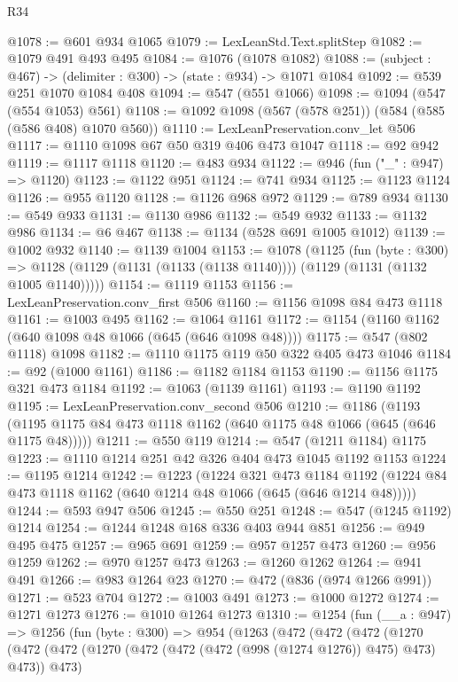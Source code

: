 \begin{lexlean}{R34}
\begin{coremodule}
@1078 := @601 @934 @1065
@1079 := LexLeanStd.Text.splitStep
@1082 := @1079 @491 @493 @495
@1084 := @1076 (@1078 @1082)
@1088 := (subject : @467) -> (delimiter : @300) -> (state : @934) -> @1071 @1084
@1092 := @539 @251 @1070 @1084 @408
@1094 := @547 (@551 @1066)
@1098 := @1094 (@547 (@554 @1053) @561)
@1108 := @1092 @1098 (@567 (@578 @251)) (@584 (@585 (@586 @408) @1070 @560))
@1110 := LexLeanPreservation.conv_let @506
@1117 := @1110 @1098 @67 @50 @319 @406 @473 @1047
@1118 := @92 @942
@1119 := @1117 @1118
@1120 := @483 @934
@1122 := @946 (fun ("_" : @947) => @1120)
@1123 := @1122 @951
@1124 := @741 @934
@1125 := @1123 @1124
@1126 := @955 @1120
@1128 := @1126 @968 @972
@1129 := @789 @934
@1130 := @549 @933
@1131 := @1130 @986
@1132 := @549 @932
@1133 := @1132 @986
@1134 := @6 @467
@1138 := @1134 (@528 @691 @1005 @1012)
@1139 := @1002 @932
@1140 := @1139 @1004
@1153 := @1078
    (@1125
      (fun (byte : @300) =>
      @1128 (@1129 (@1131 (@1133 (@1138 @1140)))) (@1129 (@1131 (@1132 @1005 @1140)))))
@1154 := @1119 @1153
@1156 := LexLeanPreservation.conv_first @506
@1160 := @1156 @1098 @84 @473 @1118
@1161 := @1003 @495
@1162 := @1064 @1161
@1172 := @1154 (@1160 @1162 (@640 @1098 @48 @1066 (@645 (@646 @1098 @48))))
@1175 := @547 (@802 @1118) @1098
@1182 := @1110 @1175 @119 @50 @322 @405 @473 @1046
@1184 := @92 (@1000 @1161)
@1186 := @1182 @1184 @1153
@1190 := @1156 @1175 @321 @473 @1184
@1192 := @1063 (@1139 @1161)
@1193 := @1190 @1192
@1195 := LexLeanPreservation.conv_second @506
@1210 := @1186
    (@1193 (@1195 @1175 @84 @473 @1118 @1162 (@640 @1175 @48 @1066 (@645 (@646 @1175 @48)))))
@1211 := @550 @119
@1214 := @547 (@1211 @1184) @1175
@1223 := @1110 @1214 @251 @42 @326 @404 @473 @1045 @1192 @1153
@1224 := @1195 @1214
@1242 := @1223
    (@1224
      @321
      @473
      @1184
      @1192
      (@1224 @84 @473 @1118 @1162 (@640 @1214 @48 @1066 (@645 (@646 @1214 @48)))))
@1244 := @593 @947 @506
@1245 := @550 @251
@1248 := @547 (@1245 @1192) @1214
@1254 := @1244 @1248 @168 @336 @403 @944 @851
@1256 := @949 @495 @475
@1257 := @965 @691
@1259 := @957 @1257 @473
@1260 := @956 @1259
@1262 := @970 @1257 @473
@1263 := @1260 @1262
@1264 := @941 @491
@1266 := @983 @1264 @23
@1270 := @472 (@836 (@974 @1266 @991))
@1271 := @523 @704
@1272 := @1003 @491
@1273 := @1000 @1272
@1274 := @1271 @1273
@1276 := @1010 @1264 @1273
@1310 := @1254
    (fun (__a : @947) =>
    @1256
      (fun (byte : @300) =>
      @954
        (@1263
          (@472
            (@472
              (@472
                (@1270
                  (@472
                    (@472 (@1270 (@472 (@472 (@472 (@998 (@1274 @1276)) @475) @473) @473)) @473)

\end{coremodule}
\end{lexlean}
